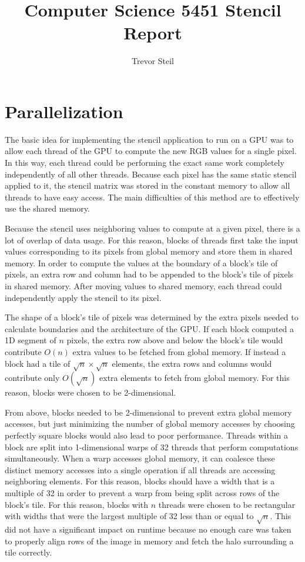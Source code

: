 \documentclass[a4paper]{article}
\title{Computer Science 5451 Stencil Report }
\date{}
\author{Trevor Steil}
\begin{document}
\maketitle

\section{Parallelization}

The basic idea for implementing the stencil application to run on a GPU was to allow each thread of the GPU to compute the new RGB values for a single
pixel. In this way, each thread could be performing the exact same work completely independently of all other threads. Because each pixel has the same
static stencil applied to it, the stencil matrix was stored in the constant memory to allow all threads to have easy access. The main difficulties of this
method are to effectively use the shared memory.

Because the stencil uses neighboring values to compute at a given pixel, there is a lot of overlap of data usage. For this reason, blocks of threads
first take the input values corresponding to its pixels from global memory and store them in shared memory. In order to compute the values at
the boundary of a block's tile of pixels, an extra row and column had to be appended to the block's tile of pixels in shared memory. After moving values to shared
memory, each thread could independently apply the stencil to its pixel.

The shape of a block's tile of pixels was determined by the extra pixels needed to calculate boundaries and the architecture of the GPU. If each block
computed a 1D segment of $n$ pixels, the extra row above and below the block's tile would contribute $O(n)$ extra values to be fetched from global
memory. If instead a block had a tile of $\sqrt{n} \times \sqrt{n}$ elements, the extra rows and columns would contribute only $O(\sqrt{n})$ extra
elements to fetch from global memory. For this reason, blocks were chosen to be 2-dimensional.

From above, blocks needed to be 2-dimensional to prevent extra global memory accesses, but just minimizing the number of global memory accesses by
choosing perfectly square blocks would also lead to poor performance. Threads within a block are split into 1-dimensional warps of 32 threads that perform
computations simultaneously. When a warp accesses global memory, it can coalesce these distinct memory accesses into a single operation if all threads
are accessing neighboring elements. For this reason, blocks should have a width that is a multiple of 32 in order to prevent a warp from being split
across rows of the block's tile. For this reason, blocks with $n$ threads were chosen to be rectangular with widths that were the largest multiple of 32 less than or
equal to $\sqrt{n}$. This did not have a significant impact on runtime because no enough care was taken to properly align rows of the image in memory
and fetch the halo surrounding a tile correctly.
\end{document}
